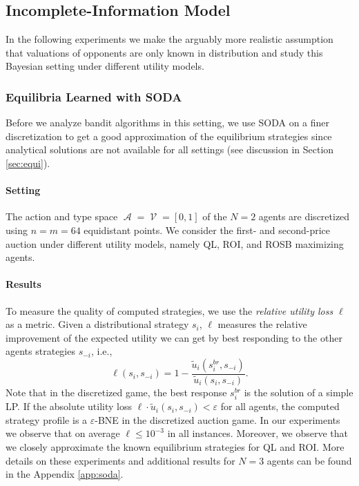 \documentclass{article}
\DeclareMathOperator{\Acal}{\mathcal{A}}
\DeclareMathOperator{\Vcal}{\mathcal{V}}
\begin{document}
\subsection{Incomplete-Information Model}
In the following experiments we make the arguably more realistic assumption that valuations of opponents are only known in distribution and study this Bayesian setting under different utility models. 

\subsubsection{Equilibria Learned with SODA} \label{sec:results_soda}
Before we analyze bandit algorithms in this setting, we use SODA on a finer discretization to get a good approximation of the equilibrium strategies since analytical solutions are not available for all settings (see discussion in Section \ref{sec:equi}).

\paragraph{Setting} 
The action and type space $\Acal = \Vcal = [0,1]$ of the $N=2$ agents are discretized using $n=m=64$ equidistant points. We consider the first- and second-price auction under different utility models, namely QL, ROI, and ROSB maximizing agents.

\paragraph{Results}
To measure the quality of computed strategies, we use the \textit{relative utility loss $\ell$} as a metric. Given a distributional strategy $s_i$, $\ell$ measures the relative improvement of the expected utility we can get by best responding to the other agents strategies $s_{-i}$, i.e., 
\begin{equation} \label{eq:discr_util_loss}
	\ell(s_i, s_{-i}) = 1 - \dfrac{\tilde u_i(s_i^{br}, s_{-i})}{\tilde u_i(s_i, s_{-i})}.
\end{equation}
Note that in the discretized game, the best response $s_i^{br}$ is the solution of a simple LP. If the absolute utility loss $\ell \cdot \tilde u_i(s_i, s_{-i}) < \varepsilon$ for all agents, the computed strategy profile is a $\varepsilon$-BNE in the discretized auction game.
In our experiments we observe that on average $\ell \leq 10^{-3}$ in all instances. Moreover, we observe that we closely approximate the known equilibrium strategies for QL and ROI. More details on these experiments and additional results for $N=3$ agents can be found in the Appendix \ref{app:soda}.
\end{document}
